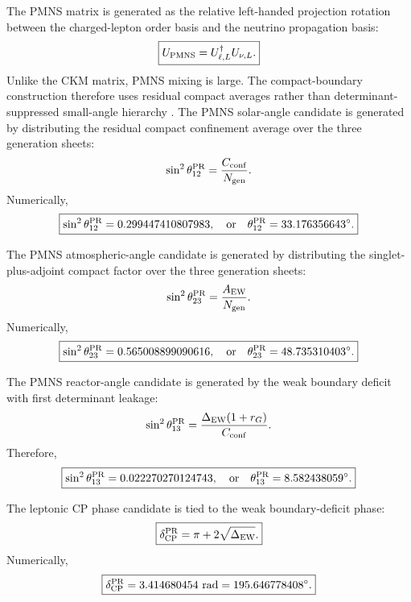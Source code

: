 \documentclass[11pt]{article}
\begin{document}
The PMNS matrix is generated as the relative left-handed projection rotation between the charged-lepton order basis and the neutrino propagation basis:
\begin{equation}
\boxed{
U_{\rm PMNS}
=
U_{\ell,L}^{\dagger}U_{\nu,L}.
}
\end{equation}
Unlike the CKM matrix, PMNS mixing is large. 
The compact-boundary construction therefore uses residual compact averages rather than determinant-suppressed small-angle hierarchy \cite{Pontecorvo1957}. The PMNS solar-angle candidate is generated by distributing the residual compact confinement average over the three generation sheets:
\begin{equation}
\sin^2\theta_{12}^{\rm PR}
=
\frac{C_{\rm conf}}{N_{\rm gen}}.
\end{equation}
Numerically,
\begin{equation}
\boxed{
\sin^2\theta_{12}^{\rm PR}
=
0.299447410807983,
\quad
\text{or}
\quad
\theta_{12}^{\rm PR}
=
33.176356643^\circ.
}
\end{equation}

The PMNS atmospheric-angle candidate is generated by distributing the singlet-plus-adjoint compact factor over the three generation sheets:
\begin{equation}
\sin^2\theta_{23}^{\rm PR}
=
\frac{A_{\rm EW}}{N_{\rm gen}}.
\end{equation}
Numerically,
\begin{equation}
\boxed{
\sin^2\theta_{23}^{\rm PR}
=
0.565008899090616,
\quad
\text{or}
\quad
\theta_{23}^{\rm PR}
=
48.735310403^\circ.
}
\end{equation}

The PMNS reactor-angle candidate is generated by the weak boundary deficit with first determinant leakage:
\begin{equation}
\sin^2\theta_{13}^{\rm PR}
=
\frac{
\Delta_{\rm EW}(1+r_G)
}{
C_{\rm conf}
}.
\end{equation}
Therefore,
\begin{equation}
\boxed{
\sin^2\theta_{13}^{\rm PR}
=
0.022270270124743,
\quad
\text{or}
\quad
\theta_{13}^{\rm PR}
=
8.582438059^\circ.
}
\end{equation}

The leptonic CP phase candidate is tied to the weak boundary-deficit phase:
\begin{equation}
\boxed{
\delta_{\rm CP}^{\rm PR}
=
\pi+2\sqrt{\Delta_{\rm EW}}.
}
\end{equation}
Numerically,
\begin{equation}
\boxed{
\delta_{\rm CP}^{\rm PR}
=
3.414680454\ {\rm rad}
=
195.646778408^\circ.
}
\end{equation}
\end{document}
